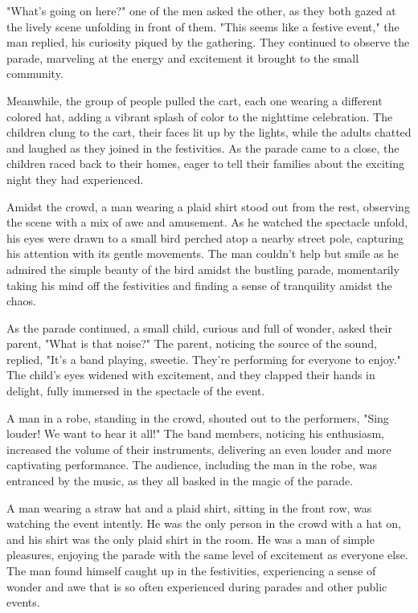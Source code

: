 \documentclass[smalldemyvopaper,11pt,twoside,onecolumn,openright,extrafontsizes]{memoir}
\begin{document}
"What's going on here?" one of the men asked the other, as they both gazed at the lively scene unfolding in front of them. "This seems like a festive event," the man replied, his curiosity piqued by the gathering. They continued to observe the parade, marveling at the energy and excitement it brought to the small community.\par
Meanwhile, the group of people pulled the cart, each one wearing a different colored hat, adding a vibrant splash of color to the nighttime celebration. The children clung to the cart, their faces lit up by the lights, while the adults chatted and laughed as they joined in the festivities. As the parade came to a close, the children raced back to their homes, eager to tell their families about the exciting night they had experienced.\par
Amidst the crowd, a man wearing a plaid shirt stood out from the rest, observing the scene with a mix of awe and amusement. As he watched the spectacle unfold, his eyes were drawn to a small bird perched atop a nearby street pole, capturing his attention with its gentle movements. The man couldn't help but smile as he admired the simple beauty of the bird amidst the bustling parade, momentarily taking his mind off the festivities and finding a sense of tranquility amidst the chaos.\par
As the parade continued, a small child, curious and full of wonder, asked their parent, "What is that noise?" The parent, noticing the source of the sound, replied, "It's a band playing, sweetie. They're performing for everyone to enjoy." The child's eyes widened with excitement, and they clapped their hands in delight, fully immersed in the spectacle of the event.\par
A man in a robe, standing in the crowd, shouted out to the performers, "Sing louder! We want to hear it all!" The band members, noticing his enthusiasm, increased the volume of their instruments, delivering an even louder and more captivating performance. The audience, including the man in the robe, was entranced by the music, as they all basked in the magic of the parade.\par
A man wearing a straw hat and a plaid shirt, sitting in the front row, was watching the event intently. He was the only person in the crowd with a hat on, and his shirt was the only plaid shirt in the room. He was a man of simple pleasures, enjoying the parade with the same level of excitement as everyone else. The man found himself caught up in the festivities, experiencing a sense of wonder and awe that is so often experienced during parades and other public events.\par
\end{document}
